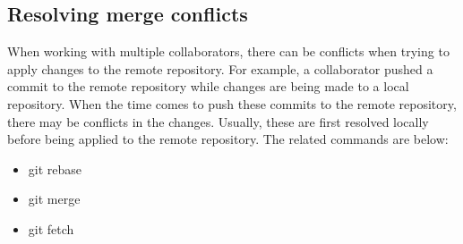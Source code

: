 \documentclass[11pt]{article}
\begin{document}
\subsection{Resolving merge conflicts}
When working with multiple collaborators, there can be conflicts when trying to apply changes to the remote repository. For example, a collaborator pushed a commit to the remote repository while changes are being made to a local repository. When the time comes to push these commits to the remote repository, there may be conflicts in the changes. Usually, these are first resolved locally before being applied to the remote repository. The related commands are below:

\begin{itemize}
  \item git rebase
  \item git merge
  \item git fetch
\end{itemize}
\end{document}
